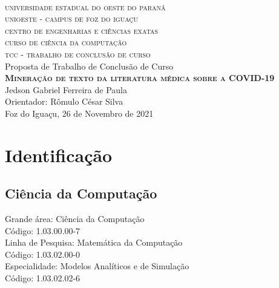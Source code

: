 \documentclass[
	12pt,				%
	a4paper,			%
	english,			%
	brazil,				%
	]{article}
\begin{document}

\begin{center}

	\textsc{
		\large
			\\universidade estadual do oeste do paran\' a
			\\unioeste - campus de foz do igua\c cu
			\\centro de engenharias e ci\^ encias exatas
			\\curso de ci\^ encia da computa\c c\~ ao
			\\[1 cm]tcc - trabalho de conclus\~ ao de curso
	}
	\\
	[4 cm]
	\large Proposta de Trabalho de Conclus\~ ao de Curso
    \\
	\textbf{
	    \textsc{Minera\c c\~ ao de texto da literatura m\' edica sobre a COVID-19}
    }
	\\[5 cm]Jedson Gabriel Ferreira de Paula
    \\Orientador: Rômulo César Silva
    \\[2 cm]Foz do Igua\c cu, 26 de Novembro de 2021
    
    
\end{center}

\thispagestyle{empty}

\section{Identifica\c c\~ ao}
    
    \subsection{Ci\^ encia da Computa\c c\~ ao} 
    
    
        \noindent Grande \' area: Ci\^ encia da Computa\c c\~ ao
        \\C\' odigo: 1.03.00.00-7 
    	\\[1 cm]Linha de Pesquisa: Matem\' atica da Computa\c c\~ ao
    	\\C\' odigo: 1.03.02.00-0
    	\\[1 cm]Especialidade: Modelos Anal\' iticos e de Simula{\c c}\~ ao
    	\\C\' odigo: 1.03.02.02-6
    	
\end{document}
